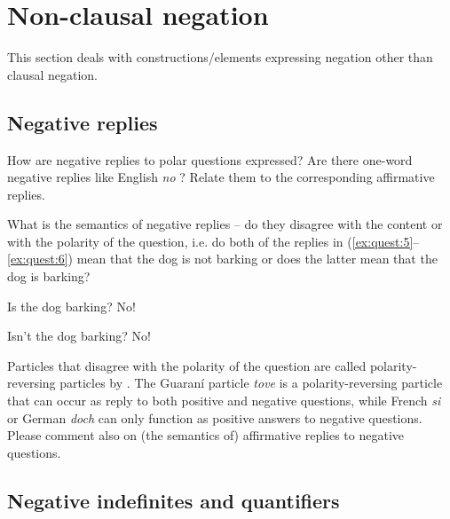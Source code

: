 \documentclass[output=paper,colorlinks,citecolor=brown]{langscibook}
\begin{document}
\section{Non-clausal negation}\label{sec:quest:3}

This section deals with constructions/elements expressing negation other than clausal negation.

\subsection{Negative replies}\label{sec:quest:3.1}

How are negative replies to polar questions expressed? Are there one-word negative replies like English \textit{no} ? Relate them to the corresponding affirmative replies.

What is the semantics of negative replies – do they disagree with the content or with the polarity of the question, i.e. do both of the replies in (\ref{ex:quest:5}--\ref{ex:quest:6}) mean that the dog is not barking or does the latter mean that the dog is barking?



\ea\label{ex:quest:5}
    \begin{xlist}
        \glt Is the dog barking?
        \glt No!
    \end{xlist}
\z 
\ea\label{ex:quest:6}
    \begin{xlist}
        \glt Isn't the dog barking?
        \glt No!
    \end{xlist}
\z 

Particles that disagree with the polarity of the question are called polarity-reversing particles by \citet{Holmberg2015}. The Guaraní particle \textit{tove} is a polarity-reversing particle that can occur as reply to both positive and negative questions, while French \textit{si} or German \textit{doch} can only function as positive answers to negative questions. Please comment also on (the semantics of) affirmative replies to negative questions. 

\subsection{Negative indefinites and quantifiers}\label{sec:quest:3.2}
\end{document}
